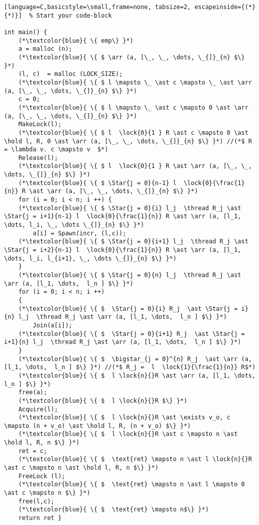 \documentclass[8pt]{article}
\newcommand{\arr}{\text{array}}
\newcommand{\lock}[2]{ \square \hspace{-1ex} \xrightarrow[#1]{#2}}
\newcommand{\thread}{\ocircle \hspace{-1ex} \rightarrow}
\newcommand{\hold}{\text{Hold }}
\newcommand{\Star}[2]{ \underset{#1}{\overset{#2}{\bigstar}} }
\begin{document}
\begin{lstlisting}[language=C,basicstyle=\small,frame=none, tabsize=2, escapeinside={(*}{*)}]  % Start your code-block

int main() {
	(*\textcolor{blue}{ \{ emp\} }*)
	a = malloc (n);	
	(*\textcolor{blue}{ \{ $ \arr (a, [\_, \_, \dots, \_{]}_{n} $\} }*)
	(l, c)  = malloc (LOCK_SIZE);
	(*\textcolor{blue}{ \{ $ l \mapsto \_ \ast c \mapsto \_ \ast \arr (a, [\_, \_, \dots, \_{]}_{n} $\} }*)
	c = 0;
	(*\textcolor{blue}{ \{ $ l \mapsto \_ \ast c \mapsto 0 \ast \arr (a, [\_, \_, \dots, \_{]}_{n} $\} }*)
	MakeLock(l);
	(*\textcolor{blue}{ \{ $ l  \lock{0}{1 } R \ast c \mapsto 0 \ast \hold l, R, 0 \ast \arr (a, [\_, \_, \dots, \_{]}_{n} $\} }*) //(*$ R = \lambda v. c \mapsto v  $*)
	Release(l);
	(*\textcolor{blue}{ \{ $ l  \lock{0}{1 } R \ast \arr (a, [\_, \_, \dots, \_{]}_{n} $\} }*) 
	(*\textcolor{blue}{ \{ $ \Star{j = 0}{n-1} l  \lock{0}{\frac{1}{n}} R \ast \arr (a, [\_, \_, \dots, \_{]}_{n} $\} }*)
	for (i = 0; i < n; i ++) {
	(*\textcolor{blue}{ \{ $ \Star{j = 0}{i} l_j  \thread R_j \ast \Star{j = i+1}{n-1} l  \lock{0}{\frac{1}{n}} R \ast \arr (a, [l_1, \dots, l_i, \_, \dots \_{]}_{n} $\} }*)
		a[i] = Spawn(incr, (l,c));
	(*\textcolor{blue}{ \{ $ \Star{j = 0}{i+1} l_j  \thread R_j \ast \Star{j = i+2}{n-1} l  \lock{0}{\frac{1}{n}} R \ast \arr (a, [l_1, \dots, l_i, l_{i+1}, \_, \dots \_{]}_{n} $\} }*)
	}
	(*\textcolor{blue}{ \{ $ \Star{j = 0}{n} l_j  \thread R_j \ast \arr (a, [l_1, \dots,  l_n ] $\} }*)
	for (i = 0; i < n; i ++)
	{
	(*\textcolor{blue}{ \{ $  \Star{j = 0}{i} R_j  \ast \Star{j = i}{n} l_j  \thread R_j \ast \arr (a, [l_1, \dots,  l_n ] $\} }*)
		Join(a[i]);
	(*\textcolor{blue}{ \{ $  \Star{j = 0}{i+1} R_j  \ast \Star{j = i+1}{n} l_j  \thread R_j \ast \arr (a, [l_1, \dots,  l_n ] $\} }*)
	}
	(*\textcolor{blue}{ \{ $  \bigstar_{j = 0}^{n} R_j  \ast \arr (a, [l_1, \dots,  l_n ] $\} }*) //(*$ R_j =  l  \lock{1}{\frac{1}{n}} R$*)
	(*\textcolor{blue}{ \{ $  l \lock{n}{}R \ast \arr (a, [l_1, \dots,  l_n ] $\} }*)
	free(a);
	(*\textcolor{blue}{ \{ $  l \lock{n}{}R $\} }*)
	Acquire(l);
	(*\textcolor{blue}{ \{ $  l \lock{n}{}R \ast \exists v_o, c \mapsto (n + v_o) \ast \hold l, R, (n + v_o) $\} }*)
	(*\textcolor{blue}{ \{ $  l \lock{n}{}R \ast c \mapsto n \ast \hold l, R, n $\} }*)
	ret = c;
	(*\textcolor{blue}{ \{ $  \text{ret} \mapsto n \ast l \lock{n}{}R \ast c \mapsto n \ast \hold l, R, n $\} }*)
	FreeLock (l);
	(*\textcolor{blue}{ \{ $  \text{ret} \mapsto n \ast l \mapsto 0 \ast c \mapsto n $\} }*)
	free(l,c); 
	(*\textcolor{blue}{ \{ $  \text{ret} \mapsto n$\} }*)
	return ret }
\end{lstlisting}
\end{document}

